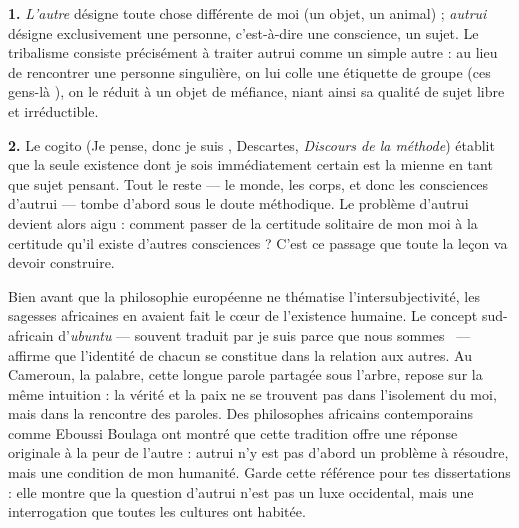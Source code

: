 \documentclass[11pt]{article}
\begin{document}
\begin{corrige}[Exercice 1 et 2]
\textbf{1.} \emph{L'autre} désigne toute chose différente de moi (un objet, un animal) ; \emph{autrui} désigne exclusivement une personne, c'est-à-dire une conscience, un sujet. Le tribalisme consiste précisément à traiter autrui comme un simple \guillemotleft autre \guillemotright : au lieu de rencontrer une personne singulière, on lui colle une étiquette de groupe (\guillemotleft ces gens-là \guillemotright), on le réduit à un objet de méfiance, niant ainsi sa qualité de sujet libre et irréductible.

\textbf{2.} Le cogito (\guillemotleft Je pense, donc je suis \guillemotright, Descartes, \emph{Discours de la méthode}) établit que la seule existence dont je sois immédiatement certain est la mienne en tant que sujet pensant. Tout le reste — le monde, les corps, et donc les consciences d'autrui — tombe d'abord sous le doute méthodique. Le problème d'autrui devient alors aigu : comment passer de la certitude solitaire de mon moi à la certitude qu'il existe d'autres consciences ? C'est ce passage que toute la leçon va devoir construire.
\end{corrige}

\begin{savaistu}
Bien avant que la philosophie européenne ne thématise l'intersubjectivité, les sagesses africaines en avaient fait le cœur de l'existence humaine. Le concept sud-africain d'\emph{ubuntu} — souvent traduit par \guillemotleft je suis parce que nous sommes \guillemotright\ — affirme que l'identité de chacun se constitue dans la relation aux autres. Au Cameroun, la palabre, cette longue parole partagée sous l'arbre, repose sur la même intuition : la vérité et la paix ne se trouvent pas dans l'isolement du moi, mais dans la rencontre des paroles. Des philosophes africains contemporains comme Eboussi Boulaga ont montré que cette tradition offre une réponse originale à la peur de l'autre : autrui n'y est pas d'abord un problème à résoudre, mais une condition de mon humanité. Garde cette référence pour tes dissertations : elle montre que la question d'autrui n'est pas un luxe occidental, mais une interrogation que toutes les cultures ont habitée.
\end{savaistu}
\end{document}
